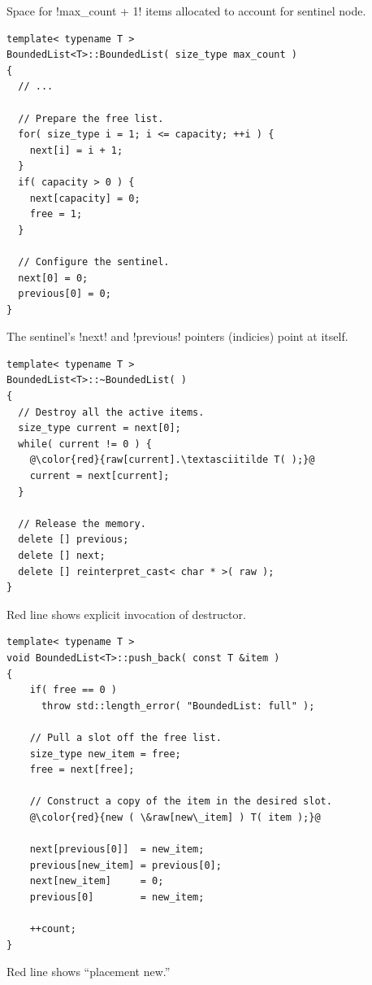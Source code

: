\documentclass[landscape]{slides}
\begin{document}
Space for !max_count + 1! items allocated to account for sentinel node.
\stopslide


{\small
\begin{lstlisting}
template< typename T >
BoundedList<T>::BoundedList( size_type max_count )
{
  // ...

  // Prepare the free list.
  for( size_type i = 1; i <= capacity; ++i ) {
    next[i] = i + 1;
  }
  if( capacity > 0 ) {
    next[capacity] = 0;
    free = 1;
  }

  // Configure the sentinel.
  next[0] = 0;
  previous[0] = 0;
}
\end{lstlisting}
}
The sentinel's !next! and !previous! pointers (indicies) point at itself.
\stopslide


{\small
\begin{lstlisting}[escapechar=@]
template< typename T >
BoundedList<T>::~BoundedList( )
{
  // Destroy all the active items.
  size_type current = next[0];
  while( current != 0 ) {
    @\color{red}{raw[current].\textasciitilde T( );}@
    current = next[current];
  }

  // Release the memory.
  delete [] previous;
  delete [] next;
  delete [] reinterpret_cast< char * >( raw );
}
\end{lstlisting}
}
Red line shows explicit invocation of destructor. 
\stopslide


{\small
\begin{lstlisting}[escapechar=@]
template< typename T >
void BoundedList<T>::push_back( const T &item )
{
    if( free == 0 )
      throw std::length_error( "BoundedList: full" );

    // Pull a slot off the free list.
    size_type new_item = free;
    free = next[free];

    // Construct a copy of the item in the desired slot.
    @\color{red}{new ( \&raw[new\_item] ) T( item );}@

    next[previous[0]]  = new_item;
    previous[new_item] = previous[0];
    next[new_item]     = 0;
    previous[0]        = new_item;

    ++count;
}
\end{lstlisting}
}
Red line shows ``placement new.'' 
\stopslide
\end{document}
